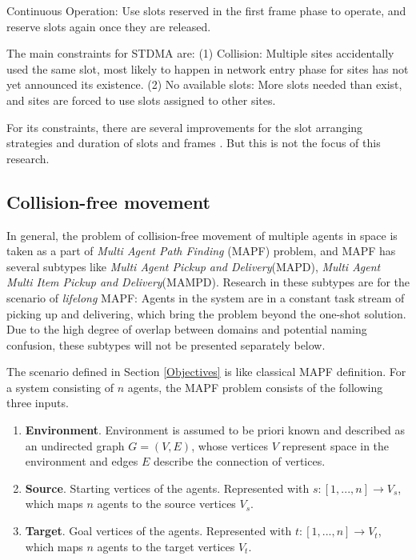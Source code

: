 \documentclass[12pt, oneside]{article}
\begin{document}
Continuous Operation: Use slots reserved in the first frame phase to operate, and reserve slots again once they are released.

The main constraints for STDMA are:
(1) Collision: Multiple sites accidentally used the same slot, most likely to happen in network entry phase for sites has not yet announced its existence. (2) No available slots: More slots needed than exist, and sites are forced to use slots assigned to other sites. 

For its constraints, there are several improvements for the slot arranging strategies \cite{STDMA_rule_improv1} and duration of slots and frames \cite{STDMA_para_improv1} \cite{STDMA_para_improv2}. But this is not the focus of this research.



\subsection{Collision-free movement}


In general, the problem of collision-free movement of multiple agents in space is taken as a part of \textit{Multi Agent Path Finding} (MAPF) \cite{MAPF_Deadlock_Explain1} problem, and MAPF has several subtypes like \textit{Multi Agent Pickup and Delivery}(MAPD), \textit{Multi Agent Multi Item Pickup and Delivery}(MAMPD)\cite{MAMPD}. Research in these subtypes are for the scenario of \textit{lifelong} MAPF: Agents in the system are in a constant task stream of picking up and delivering, which bring the problem beyond the one-shot solution. Due to the high degree of overlap between domains and potential naming confusion, these subtypes will not be presented separately below.

The scenario defined in Section \ref{Objectives} is like classical MAPF definition. For a system consisting of $n$ agents, the MAPF problem consists of the following three inputs. 
\begin{enumerate}
    \item \textbf{Environment}. Environment is assumed to be priori known and described as an undirected graph $G = (V,E)$, whose vertices $V$ represent space in the environment and edges $E$ describe the connection of vertices.
    \item \textbf{Source}. Starting vertices of the agents. Represented with $s:[1,...,n]\rightarrow V_{s}$, which maps $n$ agents to the source vertices $V_{s}$.
    \item \textbf{Target}. Goal vertices of the agents. Represented with $t:[1,...,n]\rightarrow V_{t}$, which maps $n$ agents to the target vertices $V_{t}$.
\end{enumerate}
\end{document}
